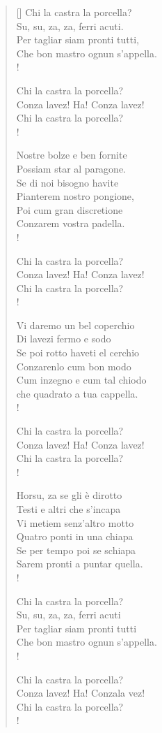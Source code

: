 \documentclass[italian,a4paper,10pt]{article}
\begin{document}
\begin{multicols}{2}
\begin{verse}[\versewidth]
Chi la castra la porcella?\\
Su, su, za, za, ferri acuti.\\
Per tagliar siam pronti tutti,\\
Che bon mastro ognun s'appella.\\!

Chi la castra la porcella?\\
Conza lavez! Ha! Conza lavez!\\
Chi la castra la porcella?\\!

Nostre bolze e ben fornite\\
Possiam star al paragone.\\
Se di noi bisogno havite\\
Pianterem nostro pongione,\\
Poi cum gran discretione\\
Conzarem vostra padella.\\!

Chi la castra la porcella?\\
Conza lavez! Ha! Conza lavez!\\
Chi la castra la porcella?\\!

Vi daremo un bel coperchio\\
Di lavezi fermo e sodo\\
Se poi rotto haveti el cerchio\\
Conzarenlo cum bon modo\\
Cum inzegno e cum tal chiodo\\
che quadrato a tua cappella.\\!

\columnbreak

Chi la castra la porcella?\\
Conza lavez! Ha! Conza lavez!\\
Chi la castra la porcella?\\!

Horsu, za se gli è dirotto\\
Testi e altri che s'incapa\\
Vi metiem senz'altro motto\\
Quatro ponti in una chiapa\\
Se per tempo poi se schiapa\\
Sarem pronti a puntar quella.\\!

Chi la castra la porcella?\\
Su, su, za, za, ferri acuti\\
Per tagliar siam pronti tutti\\
Che bon mastro ognun s'appella.\\!

Chi la castra la porcella?\\
Conza lavez! Ha! Conzala vez!\\
Chi la castra la porcella?\\!
\end{verse}
\end{multicols}
\end{document}
